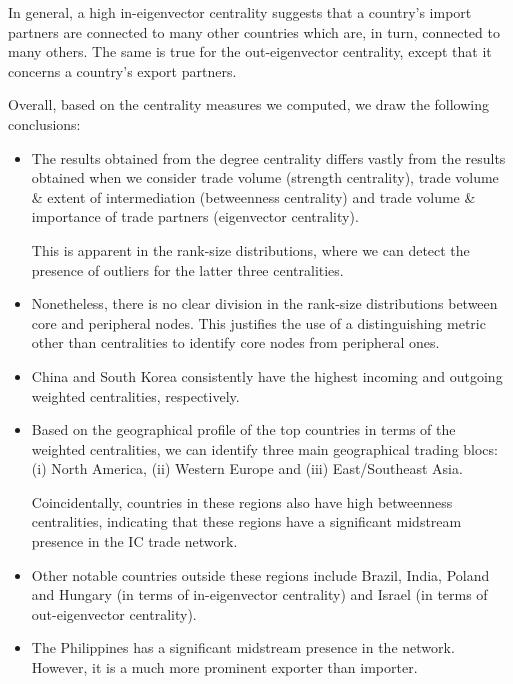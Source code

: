 \documentclass[12pt,letterpaper]{report}
\begin{document}
			In general, a high in-eigenvector centrality suggests that a country's import partners are connected to many other countries which are, in turn, connected to many others. The same is true for the out-eigenvector centrality, except that it concerns a country's export partners.
			
			Overall, based on the centrality measures we computed, we draw the following conclusions:
			
			\begin{itemize}
				\item The results obtained from the degree centrality differs vastly from the results obtained when we consider trade volume (strength centrality), trade volume \& extent of intermediation (betweenness centrality) and trade volume \& importance of trade partners (eigenvector centrality). 
				
				This is apparent in the rank-size distributions, where we can detect the presence of outliers for the latter three centralities.
				
				\item Nonetheless, there is no clear division in the rank-size distributions between core and peripheral nodes. This justifies the use of a distinguishing metric other than centralities to identify core nodes from peripheral ones.
				
				\item China and South Korea consistently have the highest incoming and outgoing weighted centralities, respectively. 
				
				\item Based on the geographical profile of the top countries in terms of the weighted centralities, we can identify three main geographical trading blocs: (i) North America, (ii) Western Europe and (iii) East/Southeast Asia. 
				
				Coincidentally, countries in these regions also have high betweenness centralities, indicating that these regions have a significant midstream presence in the IC trade network.
				
				\item Other notable countries outside these regions include Brazil, India, Poland and Hungary (in terms of in-eigenvector centrality) and Israel (in terms of out-eigenvector centrality).
				
				\item The Philippines has a significant midstream presence in the network. However, it is a much more prominent exporter than importer.
				
			\end{itemize}
			
\end{document}
